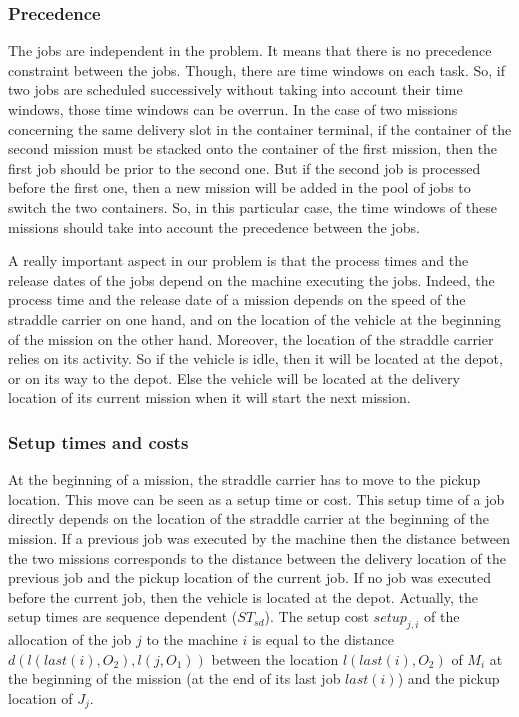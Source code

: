 \documentclass[a4paper,10pt]{article}
\begin{document}
\subsubsection{Precedence}
The jobs are independent in the problem. It means that there is no precedence constraint between the jobs. Though, there are time windows on each task. So, if two jobs are scheduled successively without taking into account their time windows, those time windows can be overrun. In the case of two missions concerning the same delivery slot in the container terminal, if the container of the second mission must be stacked onto the container of the first mission, then the first job should be prior to the second one. But if the second job is processed before the first one, then a new mission will be added in the pool of jobs to switch the two containers. So, in this particular case, the time windows of these missions should take into account the precedence between the jobs.

A really important aspect in our problem is that the process times and the release dates of the jobs depend on the machine executing the jobs. Indeed, the process time and the release date of a mission depends on the speed of the straddle carrier on one hand, and on the location of the vehicle at the beginning of the mission on the other hand. Moreover, the location of the straddle carrier relies on its activity. So if the vehicle is idle, then it will be located at the depot, or on its way to the depot. Else the vehicle will be located at the delivery location of its current mission when it will start the next mission.

\subsubsection{Setup times and costs}

At the beginning of a mission, the straddle carrier has to move to the pickup location. This move can be seen as a setup time or cost. This setup time of a job directly depends on the location of the straddle carrier at the beginning of the mission. If a previous job was executed by the machine then the distance between the two missions corresponds to the distance between the delivery location of the previous job and the pickup location of the current job. If no job was executed before the current job, then the vehicle is located at the depot. Actually, the setup times are sequence dependent ($ST_{sd}$).
The setup cost $setup_{j, i}$ of the allocation of the job $j$ to the machine $i$ is equal to the distance $d(l(last(i),O_2),l(j,O_1))$ between the location $l(last(i),O_2)$ of $M_i$ at the beginning of the mission (at the end of its last job $last(i)$) and the pickup location of $J_j$.
\end{document}
